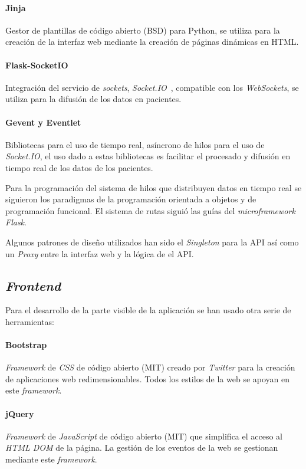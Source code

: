\paragraph{Jinja~\cite{tool:jinja}}Gestor de plantillas de código abierto (BSD) para Python, se utiliza para la creación de la interfaz web mediante la creación de páginas dinámicas en HTML.
\paragraph{Flask-SocketIO~\cite{tool:flask-socketio}}Integración del servicio de \textit{sockets}, \textit{Socket.IO}~\cite{tool:socketio}, compatible con los \textit{WebSockets}, se utiliza para la difusión de los datos en pacientes.
\paragraph{Gevent y Eventlet~\cite{tool:eventlet, tool:gevent}}Bibliotecas para el uso de tiempo real, asíncrono de hilos para el uso de \textit{Socket.IO}, el uso dado a estas bibliotecas es facilitar el procesado y difusión en tiempo real de los datos de los pacientes. 

Para la programación del sistema de hilos que distribuyen datos en tiempo real se siguieron los paradigmas de la programación orientada a objetos y de programación funcional. El sistema de rutas siguió las guías del \textit{microframework Flask}. 

Algunos patrones de diseño utilizados han sido el \textit{Singleton} para la API así como un \textit{Proxy} entre la interfaz web y la lógica de el API.

\subsection{\textit{Frontend}}

Para el desarrollo de la parte visible de la aplicación se han usado otra serie de herramientas:
\paragraph{Bootstrap~\cite{wiki:boostrap}}\textit{Framework} de \textit{CSS} de código abierto (MIT) creado por \textit{Twitter} para la creación de aplicaciones web redimensionables. Todos los estilos de la web se apoyan en este \textit{framework}.
\paragraph{jQuery~\cite{wiki:jquery}}\textit{Framework} de \textit{JavaScript} de código abierto (MIT) que simplifica el acceso al \textit{HTML DOM} de la página. La gestión de los eventos de la web se gestionan mediante este \textit{framework}.
